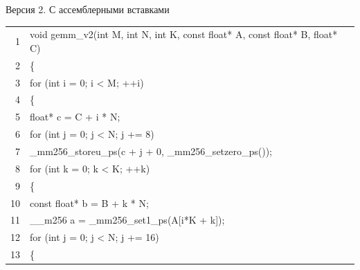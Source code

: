 \documentclass[aspectratio=169, 11pt]{beamer}
\newcommand{\K}[1]{\textcolor{kw}{#1}}   %
\newcommand{\T}[1]{\textcolor{tp}{#1}}   %
\newcommand{\N}[1]{\textcolor{nm}{#1}}   %
\newcommand{\V}[1]{\textcolor{vr}{#1}}   %
\begin{document}
\begin{frame}[fragile]{Версия 2. С ассемблерными вставками}
	\ttfamily\footnotesize
	\setlength{\baselineskip}{1.1em}
	\setlength{\parindent}{0pt}
	
	\begingroup
	\setlength{\fboxsep}{7pt}%
	\colorbox{codebg}{%
		\begin{minipage}{\dimexpr\linewidth-2\fboxsep\relax}
			\begin{tabular}{@{}r@{\hspace{1.2em}}l@{}}
				\textcolor{ln}{1} & \K{void} \V{gemm\_v2}(\T{int} \V{M}, \T{int} \V{N}, \T{int} \V{K}, \T{const} \T{float*} \V{A}, \T{const} \T{float*} \V{B}, \T{float*} \V{C}) \\
				\textcolor{ln}{2} & \{ \\
				\textcolor{ln}{3} & \hspace{1.5em}\K{for} (\T{int} \V{i} = \N{0}; \V{i} < \V{M}; ++\V{i}) \\
				\textcolor{ln}{4} & \hspace{1.5em}\{ \\
				\textcolor{ln}{5} & \hspace{3em}\T{float*} \V{c} = \V{C} + \V{i} * \V{N}; \\
				\textcolor{ln}{6} & \hspace{3em}\K{for} (\T{int} \V{j} = \N{0}; \V{j} < \V{N}; \V{j} += \N{8}) \\
				\textcolor{ln}{7} & \hspace{4.5em}\V{\_mm256\_storeu\_ps}(\V{c} + \V{j} + \N{0}, \V{\_mm256\_setzero\_ps}()); \\
				\textcolor{ln}{8} & \hspace{3em}\K{for} (\T{int} \V{k} = \N{0}; \V{k} < \V{K}; ++\V{k}) \\
				\textcolor{ln}{9} & \hspace{3em}\{ \\
				\textcolor{ln}{10} & \hspace{4.5em}\T{const} \T{float*} \V{b} = \V{B} + \V{k} * \V{N}; \\
				\textcolor{ln}{11} & \hspace{4.5em}\V{\_\_m256} \V{a} = \V{\_mm256\_set1\_ps}(\V{A}[\V{i}*\V{K} + \V{k}]); \\
				\textcolor{ln}{12} & \hspace{4.5em}\K{for} (\T{int} \V{j} = \N{0}; \V{j} < \V{N}; \V{j} += \N{16}) \\
				\textcolor{ln}{13} & \hspace{4.5em}\{ \\

\end{tabular}
\end{minipage}}
\end{frame}
\end{document}
